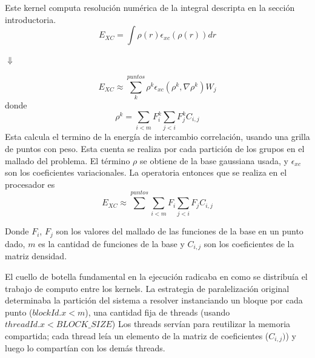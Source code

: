 Este kernel computa resoluci\'on num\'erica de la integral descripta en la secci\'on introductoria.
\begin{equation}
    E_{XC} = \int \rho(r) \epsilon_{xc}\left( \rho(r) \right ) dr
\end{equation}
\begin{center}
    $\Downarrow$
\end{center}
\begin{equation}
  E_{XC} \approx \sum^{puntos}_k \rho^k \epsilon_{xc} (\rho^k,\nabla \rho^k) W_j
\end{equation}
donde
\begin{equation}
  \rho^k = \sum_{i<m} F^k_i \sum_{j<i} F^k_j C_{i,j}
\end{equation}
Esta calcula el termino de la energ\'ia de intercambio correlaci\'on, usando una grilla
de puntos con peso. Esta cuenta se realiza por cada partici\'on de los grupos en el mallado
del problema. El t\'ermino $\rho$ se obtiene de la base gaussiana usada, y $\epsilon_{xc}$
son los coeficientes variacionales. La operatoria entonces que se realiza
en el procesador es
\begin{equation}
  E_{XC} \approx \sum^{puntos} \sum_{i<m} F_i \sum_{j<i} F_j C_{i,j}
\end{equation}

Donde $F_i$, $F_j$ son los valores del mallado de las funciones de la base en un punto dado,
$m$ es la cantidad de funciones de la base y $C_{i,j}$ son los coeficientes de la matriz densidad.

El cuello de botella fundamental en la ejecuci\'on radicaba en como se distribu\'ia el trabajo de computo
entre los kernels. La estrategia de paralelizaci\'on original determinaba la partici\'on
del sistema a resolver instanciando un bloque por cada punto ({$blockId.x < m$}),
una cantidad fija de threads (usando $threadId.x < BLOCK\_SIZE$)
Los threads serv\'ian para reutilizar la memoria compartida; cada thread le\'ia un
elemento de la matriz de coeficientes ($C_{i,j})$) y luego lo compart\'ian con los
dem\'as threads.


